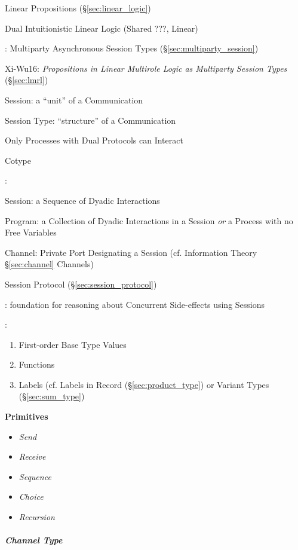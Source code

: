 Linear Propositions (\S\ref{sec:linear_logic})

Dual Intuitionistic Linear Logic \cite{caires-pfenning10} (Shared ???,
Linear)

\cite{honda-yoshida-carbone08}: Multiparty Asynchronous Session Types
(\S\ref{sec:multiparty_session})

Xi-Wu16: \emph{Propositions in Linear Multirole Logic as
  Multiparty Session Types} (\S\ref{sec:lmrl})

Session: a ``unit'' of a Communication

Session Type: ``structure'' of a Communication

Only Processes with Dual Protocols can Interact

Cotype


\cite{honda-vasconcelos-kubo98}:

Session: a Sequence of Dyadic Interactions

Program: a Collection of Dyadic Interactions in a Session \emph{or} a
Process with no Free Variables %

Channel: Private Port Designating a Session (cf. Information Theory
\S\ref{sec:channel} Channels)

Session Protocol (\S\ref{sec:session_protocol})


\cite{orchard-yoshida15}: foundation for reasoning about Concurrent
Side-effects using Sessions


\cite{neubauer-thiemann04}:
\begin{enumerate}
  \item First-order Base Type Values
  \item Functions
  \item Labels (cf. Labels in Record (\S\ref{sec:product_type}) or
    Variant Types (\S\ref{sec:sum_type})
\end{enumerate}


\textbf{Primitives}

\begin{itemize}
  \item \emph{Send}
  \item \emph{Receive}
  \item \emph{Sequence}
  \item \emph{Choice}
  \item \emph{Recursion}
\end{itemize}



\subparagraph{Channel Type}\label{sec:channel_type}\hfill


